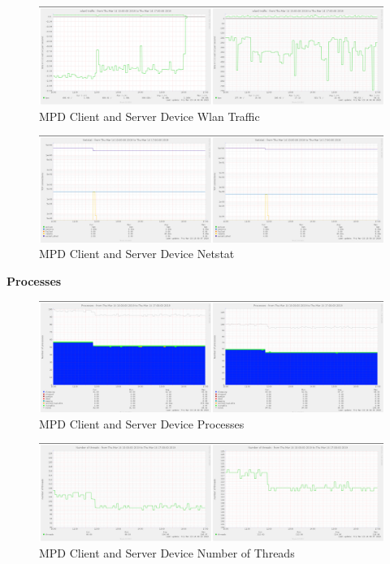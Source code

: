 \documentclass[11pt,a4paper]{scrreprt}
\begin{document}
\begin{figure}[H]
\includegraphics{ResultsAndAnalysis/MPDServerTestImages/021MPDWlan0Traffic.png}
\centering
\caption{MPD Client and Server Device Wlan Traffic}
\label{MPDWlanTraffic}
\end{figure}

\begin{figure}[H]
\includegraphics{ResultsAndAnalysis/MPDServerTestImages/017MPDNetstat.png}
\centering
\caption{MPD Client and Server Device Netstat}
\label{MPDNetstat}
\end{figure}

\textbf{Processes}

\begin{figure}[H]
\includegraphics{ResultsAndAnalysis/MPDServerTestImages/019MPDProcesses.png}
\centering
\caption{MPD Client and Server Device Processes}
\label{MPDProcesses}
\end{figure}

\begin{figure}[H]
\includegraphics{ResultsAndAnalysis/MPDServerTestImages/018MPDNoOfThreads.png}
\centering
\caption{MPD Client and Server Device Number of Threads}
\label{MPDNumThreads}
\end{figure}
\end{document}
